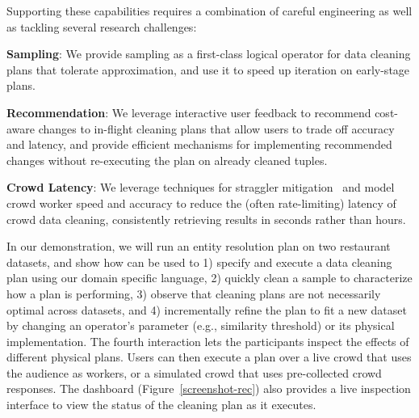 Supporting these capabilities requires a combination of careful engineering 
as well as tackling several research challenges:

\squishlist
\item \textbf{Sampling}: We provide sampling as a first-class logical operator for data cleaning plans that tolerate approximation, and use it to speed up iteration on early-stage plans.

\item \textbf{Recommendation}: We leverage interactive user feedback to recommend cost-aware changes to in-flight cleaning plans that allow users to trade off accuracy and latency, and provide efficient mechanisms for implementing recommended changes without re-executing the plan on already cleaned tuples.

\item \textbf{Crowd Latency}: We leverage techniques for straggler mitigation~\cite{venkataraman2014power} and model crowd worker speed and accuracy to reduce the (often rate-limiting) latency of crowd data cleaning, consistently retrieving results in seconds rather than hours.
\squishend

In our demonstration, we will run an entity resolution plan on two restaurant datasets, and
show how \sys can be used to 1) specify and execute a data cleaning plan using our domain specific
language, 2) quickly clean a sample to characterize how a plan is performing, 
3) observe that cleaning plans are not necessarily optimal across datasets, and 
4) incrementally refine the plan to fit a new dataset by changing an operator's parameter (e.g., similarity threshold)
or its physical implementation.
The fourth interaction lets the participants inspect the effects of different physical plans.
Users can then execute a plan over a live crowd that uses the audience as workers, or a simulated crowd
that uses pre-collected crowd responses. The dashboard (Figure~\ref{screenshot-rec}) also provides a live inspection
interface to view the status of the cleaning plan as it executes.

\vspace{-0.2cm}


